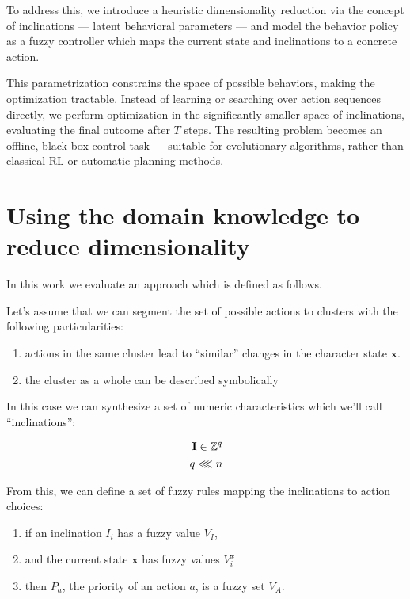 \documentclass[12pt, a4paper]{report}
\begin{document}
To address this, we introduce a heuristic dimensionality reduction via the concept of inclinations — latent behavioral parameters — and model the behavior policy as a fuzzy controller which maps the current state and inclinations to a concrete action.

This parametrization constrains the space of possible behaviors, making the optimization tractable. Instead of learning or searching over action sequences directly, we perform optimization in the significantly smaller space of inclinations, evaluating the final outcome after $T$ steps. The resulting problem becomes an offline, black-box control task — suitable for evolutionary algorithms, rather than classical RL or automatic planning methods.

	\section{Using the domain knowledge to reduce dimensionality}

	In this work we evaluate an approach which is defined as follows.
	
	Let's assume that we can segment the set of possible actions to clusters with the following particularities:
	
	\begin{enumerate}
		\item actions in the same cluster lead to ``similar'' changes in the character state $\mathbf{x}$.
		\item the cluster as a whole can be described symbolically
	\end{enumerate}
	
	In this case we can synthesize a set of numeric characteristics which we'll call ``inclinations'':
	
	\begin{eqnarray}
		\mathbf{I} \in \mathbb{Z}^q\\
		q \llless n \label{q<<n}
	\end{eqnarray}

	From this, we can define a set of fuzzy rules\cite{ray2014softcomputing} mapping the inclinations to action choices:

	\begin{enumerate}
		\item if an inclination $I_i$ has a fuzzy value $V_I$,
		\item and the current state $\mathbf{x}$ has fuzzy values $V^x_i$
		\item then $P_a$, the priority of an action $a$, is a fuzzy set $V_A$.
	\end{enumerate}
	
\end{document}
